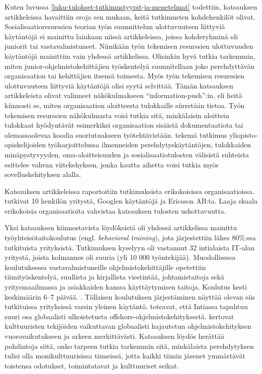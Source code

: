 \documentclass[utf8]{gradu3}
\begin{document}
Kuten luvussa \ref{luku-tulokset-tutkimustyypit-ja-menetelmat} todettiin, katsauksen artikkeleissa havaittiin eroja sen mukaan, keitä tutkimusten kohdehenkilöt olivat. Sosialisaatioresurssien teorian työn suunnittelun ulottuvuuteen liittyviä käytäntöjä ei mainittu lainkaan niissä artikkeleissa, joissa kohderyhminä oli juniorit tai vastavalmistuneet. Niinikään työn tekemisen resurssien ulottuvuuden käytäntöjä mainittiin vain yhdessä artikkelissa. Olisinkin hyvä tutkia tarkemmin, miten junior-ohjelmistokehittäjien työskentelyä suunnitellaan joko perehdyttävän organisaation tai kehittäjien itsensä toimesta. Myös työn tekemisen resurssien ulottuvuuteen liittyviä käytäntöjä olisi syytä selvittää. Tämän katsauksen artikkeleista \textcite{yates-ym-2020} olivat valinneet näkökulmakseen ``information-push'':in, eli heitä kiinnosti se, miten organisaation aloitteesta tulokkaille siirretään tietoa. Työn tekemisen resurssien näkökulmasta voisi tutkia sitä, minkälaisin aloittein tulokkaat hyödyntävät esimerkiksi organisaation sisäistä dokumentaatiota tai olemassaolevaa koodia suoriutuakseen työtehtävistään. \textcite{gruman-ym-2006} tekemä tutkimus yliopisto-opiskelijoiden työharjoittelussa ilmenneiden perehdytyskäytäntöjen, tulokkaiden minäpystyvyyden, oma-aloitteisuuden ja sosialisaatiotulosten välisistä suhteista esittelee vahvan viitekehyksen, jonka kautta aihetta voisi tutkia myös sovelluskehityksen alalla.

Katsauksen artikkeleissa raportoitiin tutkimuksista erikokoisissa organisaatioissa. \textcite{viana-ym-2014} tutkivat 10 henkilön yritystä, \textcite{johnson-senges-2010} Googlen käytäntöjä ja \textcite{britto-ym-2020} Ericsson AB:ta. Laaja skaala erikokoisia organisaatioita vahvistaa katsauksen tulosten uskottavuutta.

Yksi katsauksen kiinnostavista löydöksistä oli yhdessä artikkelissa \parencite{kulkarni-ym-2010} mainittu työyhteisötaitokoulutus (engl. \textit{behavioral training}), jota järjestettiin lähes 80\%:ssa tutkituista yrityksistä. Tutkimuksen kyselyyn oli vastannut 32 intialaista IT-alan yritystä, joista kolmannes oli suuria (yli 10 000 työntekijää). Muodollisessa koulutuksessa vastavalmistuneille ohjelmistokehittäjille opetettiin tiimityöskentelyä, suullista ja kirjallista viestintää, johtamistaitoja sekä yritysmaailmassa ja asiakkaiden kanssa käyttäytymisen taitoja. Koulutus kesti keskimäärin 6--7 päivää. \parencite{kulkarni-ym-2010}. Tällaisen koulutuksen järjestäminen näyttää olevan siis tutkituissa yrityksissä varsin yleinen käytäntö. \textcite{kulkarni-ym-2010} toteavat, että Intiassa tapahtuu suuri osa globaalisti ulkoistetusta offshore-ohjelmistokehityksestä. \textcite{olson-olson-2003} kertovat kulttuuristen tekijöiden vaikuttavan globaalisti hajautetun ohjelmistokehityksen vuorovaikutukseen ja arkeen merkittävästi. Katsauksen löydös herättää pohdintoja siitä, onko tarpeen tutkia tarkemmin sitä, minkälaista perehdytyksen tulisi olla monikulttuurisissa tiimeissä, jotta kaikki tiimin jäsenet ymmärtävät toistensa odotukset, toimintatavat ja kulttuuriset seikat.
\end{document}
